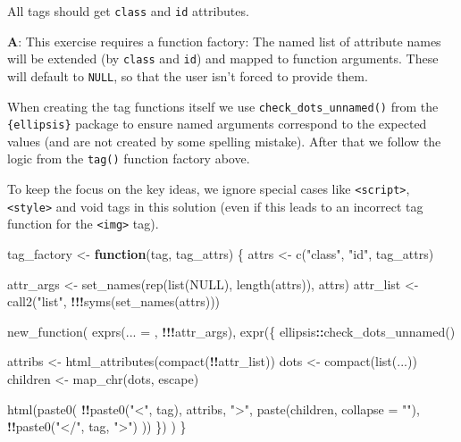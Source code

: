 \documentclass[
]{krantz}
\makeatletter
\newenvironment{Shaded}{\begin{snugshade}}{\end{snugshade}}
\newcommand{\ControlFlowTok}[1]{\textcolor[rgb]{0.13,0.29,0.53}{\textbf{#1}}}
\newcommand{\DataTypeTok}[1]{\textcolor[rgb]{0.13,0.29,0.53}{#1}}
\newcommand{\KeywordTok}[1]{\textcolor[rgb]{0.13,0.29,0.53}{\textbf{#1}}}
\newcommand{\NormalTok}[1]{#1}
\newcommand{\OperatorTok}[1]{\textcolor[rgb]{0.81,0.36,0.00}{\textbf{#1}}}
\newcommand{\OtherTok}[1]{\textcolor[rgb]{0.56,0.35,0.01}{#1}}
\newcommand{\StringTok}[1]{\textcolor[rgb]{0.31,0.60,0.02}{#1}}
\newenvironment{kframe}{%
\medskip{}
\setlength{\fboxsep}{.8em}
 \def\at@end@of@kframe{}%
 \ifinner\ifhmode%
  \def\at@end@of@kframe{\end{minipage}}%
  \begin{minipage}{\columnwidth}%
 \fi\fi%
 \def\FrameCommand##1{\hskip\@totalleftmargin \hskip-\fboxsep
 \colorbox{shadecolor}{##1}\hskip-\fboxsep
     \hskip-\linewidth \hskip-\@totalleftmargin \hskip\columnwidth}%
 \MakeFramed {\advance\hsize-\width
   \@totalleftmargin\z@ \linewidth\hsize
   \@setminipage}}%
 {\par\unskip\endMakeFramed%
 \at@end@of@kframe}
\renewenvironment{Shaded}{\begin{kframe}}{\end{kframe}}
\renewcommand{\KeywordTok} [1]{\textcolor[rgb]{0.00,0.44,0.13}{{#1}}}
\renewcommand{\DataTypeTok}[1]{\textcolor[rgb]{0.56,0.13,0.00}{{#1}}}
\renewcommand{\StringTok}  [1]{\textcolor[rgb]{0.25,0.44,0.63}{{#1}}}
\renewcommand{\OtherTok}   [1]{\textcolor[rgb]{0.00,0.44,0.13}{{#1}}}
\renewcommand{\NormalTok}  [1]{{#1}}
\makeatother
\begin{document}
All tags should get \texttt{class} and \texttt{id} attributes.

\textbf{{A}}: This exercise requires a function factory: The named list of attribute names will be extended (by \texttt{class} and \texttt{id}) and mapped to function arguments. These will default to \texttt{NULL}, so that the user isn't forced to provide them.

When creating the tag functions itself we use \texttt{check\_dots\_unnamed()} from the \texttt{\{ellipsis\}} package to ensure named arguments correspond to the expected values (and are not created by some spelling mistake). After that we follow the logic from the \texttt{tag()} function factory above.

To keep the focus on the key ideas, we ignore special cases like \texttt{\textless{}script\textgreater{}}, \texttt{\textless{}style\textgreater{}} and void tags in this solution (even if this leads to an incorrect tag function for the \texttt{\textless{}img\textgreater{}} tag).

\begin{Shaded}
\begin{Highlighting}[]
\NormalTok{tag_factory <-}\StringTok{ }\ControlFlowTok{function}\NormalTok{(tag, tag_attrs) \{}
\NormalTok{  attrs <-}\StringTok{ }\KeywordTok{c}\NormalTok{(}\StringTok{"class"}\NormalTok{, }\StringTok{"id"}\NormalTok{, tag_attrs)}
  
\NormalTok{  attr_args <-}\StringTok{ }\KeywordTok{set_names}\NormalTok{(}\KeywordTok{rep}\NormalTok{(}\KeywordTok{list}\NormalTok{(}\OtherTok{NULL}\NormalTok{), }\KeywordTok{length}\NormalTok{(attrs)), attrs)}
\NormalTok{  attr_list <-}\StringTok{ }\KeywordTok{call2}\NormalTok{(}\StringTok{"list"}\NormalTok{, }\OperatorTok{!!!}\KeywordTok{syms}\NormalTok{(}\KeywordTok{set_names}\NormalTok{(attrs)))}
  
  \KeywordTok{new_function}\NormalTok{(}
    \KeywordTok{exprs}\NormalTok{(}\DataTypeTok{... =}\NormalTok{ , }\OperatorTok{!!!}\NormalTok{attr_args),}
    \KeywordTok{expr}\NormalTok{(\{}
\NormalTok{      ellipsis}\OperatorTok{::}\KeywordTok{check_dots_unnamed}\NormalTok{()}
      
\NormalTok{      attribs <-}\StringTok{ }\KeywordTok{html_attributes}\NormalTok{(}\KeywordTok{compact}\NormalTok{(}\OperatorTok{!!}\NormalTok{attr_list))}
\NormalTok{      dots <-}\StringTok{ }\KeywordTok{compact}\NormalTok{(}\KeywordTok{list}\NormalTok{(...))}
\NormalTok{      children <-}\StringTok{ }\KeywordTok{map_chr}\NormalTok{(dots, escape)}
      
      \KeywordTok{html}\NormalTok{(}\KeywordTok{paste0}\NormalTok{(}
        \OperatorTok{!!}\KeywordTok{paste0}\NormalTok{(}\StringTok{"<"}\NormalTok{, tag), attribs, }\StringTok{">"}\NormalTok{,}
        \KeywordTok{paste}\NormalTok{(children, }\DataTypeTok{collapse =} \StringTok{""}\NormalTok{),}
        \OperatorTok{!!}\KeywordTok{paste0}\NormalTok{(}\StringTok{"</"}\NormalTok{, tag, }\StringTok{">"}\NormalTok{)}
\NormalTok{      ))}
\NormalTok{    \})}
\NormalTok{  )}
\NormalTok{\}}
\end{Highlighting}
\end{Shaded}
\end{document}
